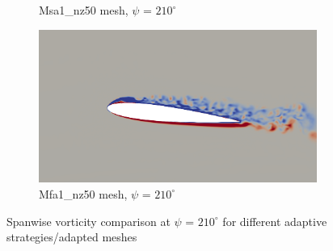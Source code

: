 \begin{figure}[H]
\begin{subfigure}[b]{0.475\textwidth}
\caption{Msa1\_nz50 mesh, $\psi$ = $210^\circ$}
\label{fig:hadapt_psi210}
\end{subfigure}
\begin{subfigure}[b]{0.475\textwidth}
\centering
\includegraphics[width=1\textwidth]{figures/adapt_strat/vorticity_plots/Mfa1_50/phase_210.png}
\caption{Mfa1\_nz50 mesh, $\psi$ = $210^\circ$}
\label{fig:FB_psi210}
\end{subfigure}
\caption{Spanwise vorticity comparison at $\psi$ = $210^\circ$ for different adaptive strategies/adapted meshes}
\label{fig:vorticity_210}
\end{figure}



